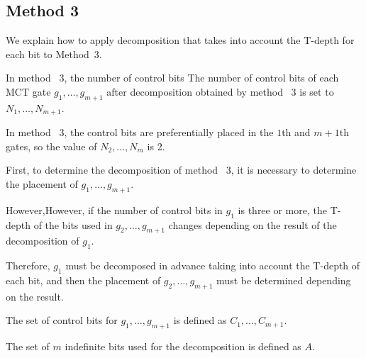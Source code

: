 \par
{}
\subsection{Method 3}
We explain how to apply decomposition that takes into account the T-depth for each bit to Method~3.
\par
In method ~3, the number of control bits 
The number of control bits of each MCT gate $g_{1},\dots, g_{m+1}$ after decomposition obtained by method ~3 is set to $N_{1},\dots, N_{m+1}$.

In method ~3, the control bits are preferentially placed in the $1$th and $m+1$th gates, so the value of $N_{2},\dots, N_{m}$ is 2.

\par
First, to determine the decomposition of method ~3, it is necessary to determine the placement of $g_{1},\dots,g_{m+1}$.

However,However, if the number of control bits in $g_{1}$ is three or more, the T-depth of the bits used in $g_{2},\dots, g_{m+1}$ changes depending on the result of the decomposition of $g_{1}$.

Therefore, $g_{1}$ must be decomposed in advance taking into account the T-depth of each bit,
and then the placement of $g_{2},\dots, g_{m+1}$ must be determined depending on the result.

The set of control bits for $g_{1},\dots,g_{m+1}$ is defined as $C_{1},\dots,C_{m+1}$.

The set of $m$ indefinite bits used for the decomposition is defined as $A$.

